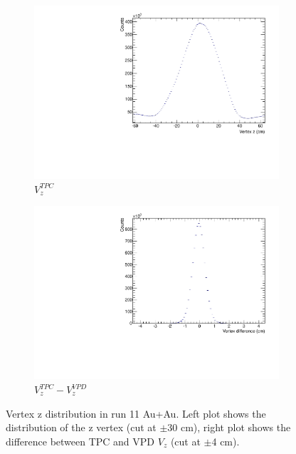\begin{figure}[htbp]
    \begin{subfigure}{0.5\textwidth}
        \includegraphics[width=\textwidth]{Plots/NPE/VzAuAu.pdf}
        \caption{$V_{z}^{TPC}$}
        \label{fig:VzAuAu}
    \end{subfigure}
    \begin{subfigure}{0.5\textwidth}
        \includegraphics[width=\textwidth]{Plots/NPE/VzDiff.pdf}
        \caption{$V_z^{TPC} - V_z^{VPD}$}
        \label{fig:VertexDiff}
    \end{subfigure}
\caption[TPC $V_z$ and TPC VPD Difference]{Vertex z distribution in run 11 Au+Au. Left plot shows the distribution of the z vertex (cut at $\pm$30 cm), right plot shows the difference between TPC and VPD $V_z$ (cut at $\pm$4 cm).}
\label{fig:Vertexz}
\end{figure}

